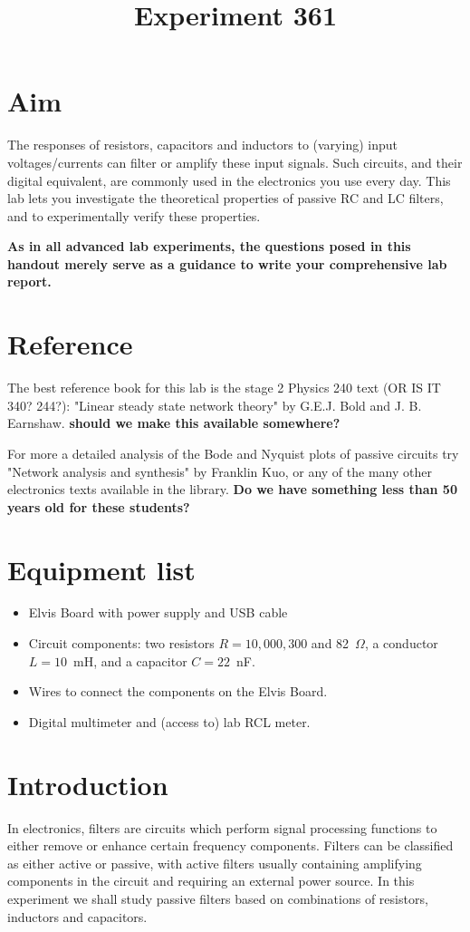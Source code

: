 \documentclass{article}
\begin{document}
\title{Experiment 361}
\author{ }
\maketitle

\section*{Aim}
The responses of resistors, capacitors and inductors to (varying)
input voltages/currents can filter or amplify these input
signals. Such circuits, and their digital equivalent, are commonly
used in the electronics you use every day. This lab lets you
investigate the theoretical properties of passive RC and LC filters,
and to experimentally verify these properties.

{\bf As in all advanced lab experiments, the questions posed in this
handout merely serve as a guidance to write your comprehensive lab
report.}

\section*{Reference}
The best reference book for this lab is the stage 2 Physics 240 text
(OR IS IT 340? 244?): "Linear steady state network theory" by
G.E.J. Bold and J. B. Earnshaw. {\bf should we make this available
  somewhere?}

For more a detailed analysis of the Bode and Nyquist plots of passive
circuits try "Network analysis and synthesis" by Franklin Kuo, or any
of the many other electronics texts available in the library. {\bf Do
  we have something less than 50 years old for these students?}

\section*{Equipment list}
\begin{itemize}
\item Elvis Board with power supply and USB cable
\item Circuit components: two resistors
  $R = 10,000, 300$ and 82~$\Omega$, a conductor $L = 10$~mH, and a
  capacitor $C=22$~nF. 
\item Wires to connect the components on the Elvis Board.
\item Digital multimeter and (access to) lab RCL meter.
\end{itemize}

\section*{Introduction}
In electronics, filters are circuits which perform signal processing
functions to either remove or enhance certain frequency
components. Filters can be classified as either active or passive,
with active filters usually containing amplifying components in the
circuit and requiring an external power source. In this experiment we
shall study passive filters based on combinations of resistors,
inductors and capacitors. 
\end{document}
